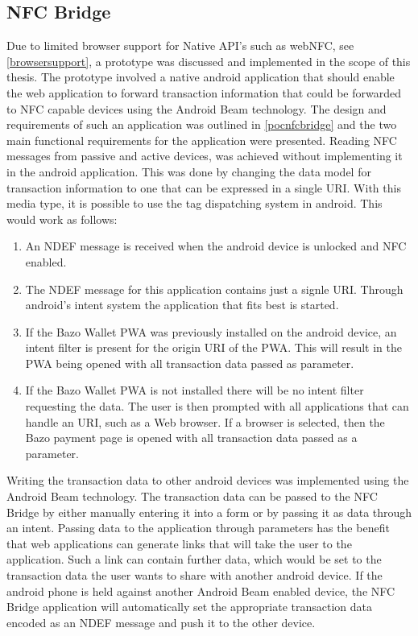 \subsection{NFC Bridge}\label{nfcbridge}
Due to limited browser support for Native API's such as webNFC, see \ref{browsersupport}, a prototype was discussed and implemented in the scope of this thesis. The prototype involved a native android application that should enable the web application to forward transaction information that could be forwarded to NFC capable devices using the Android Beam technology.
The design and requirements of such an application was outlined in \ref{pocnfcbridge} and the two main functional requirements for the application were presented.
Reading NFC messages from passive and active devices, was achieved without implementing it in the android application. This was done by changing the data model for transaction information to one that can be expressed in a single URI. With this media type, it is possible to use the tag dispatching system in android. This would work as follows:
\begin{enumerate}
\item An NDEF message is received when the android device is unlocked and NFC enabled.
\item The NDEF message for this application contains just a signle URI. Through android's intent system the application that fits best is started.
\item If the Bazo Wallet PWA was previously installed on the android device, an intent filter is present for the origin URI of the PWA. This will result in the PWA being opened with all transaction data passed as parameter.
\item If the Bazo Wallet PWA is not installed there will be no intent filter requesting the data. The user is then prompted with all applications that can handle an URI, such as a Web browser. If a browser is selected, then the Bazo payment page is opened with all transaction data passed as a parameter.
\end{enumerate}


Writing the transaction data to other android devices was implemented using the Android Beam technology.
The transaction data can be passed to the NFC Bridge by either manually entering it into a form or by passing it as data through an intent. Passing data to the application through parameters has the benefit that web applications can generate links that will take the user to the application. Such a link can contain further data, which would be set to the transaction data the user wants to share with another android device.
If the android phone is held against another Android Beam enabled device, the NFC Bridge application will automatically set the appropriate transaction data encoded as an NDEF message and push it to the other device.

